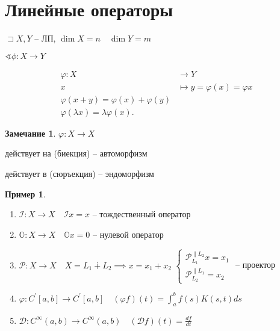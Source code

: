 \documentclass{book}
\newcommand{\p}[1]{#1^{\prime}}
\theoremstyle{definition}
\newtheorem*{note}{Замечание}
\newtheorem*{example}{Пример}
\begin{document}
\section{Линейные операторы}

 \begin{definition}
    $\sqsupset X, Y$ -- ЛП, $\dim X = n\quad \dim Y = m$

     $\sphericalangle \phi: X\to Y$

     \begin{align*}
         \varphi: X &\longrightarrow Y \\
         x &\longmapsto y = \varphi(x) = \varphi x\\
         \varphi(x+y) = \varphi(x) + \varphi(y)\\
         \varphi\left(\lambda x  \right) = \lambda \varphi(x) 
     .\end{align*}    
\end{definition}

\begin{note}
    $\varphi: X\longrightarrow X$

    действует на (биекция) -- автоморфизм

    действует в (сюръекция) -- эндоморфизм
\end{note}

\begin{example}
    \begin{enumerate}
        \item $\mathscr{I}: X\to X\quad \mathscr{I}x = x$ -- тождественный оператор
        \item $\mathbb{O}:X\to X\quad \mathbb{O}x = 0$ -- нулевой оператор
        \item  $\mathscr{P}:X\to X\quad X = L_1 \dotplus L_2 \implies x = x_1+x_2$
            $\begin{cases}
                \mathscr{P}_{L_1}^{\parallel L_2}x = x_1\\
                \mathscr{P}_{L_2}^{\parallel L_1} = x_2
            \end{cases}$ -- проектор
        \item $\varphi: \p C[a,b] \to  \p C[a,b]\quad \left( \varphi f \right) (t) = \int_a^bf(s)K(s,t)ds$
        \item $\mathscr{D}: C^{\infty }(a,b) \to  C^{\infty}(a,b)\quad \left( \mathscr{D}f \right) (t) = \frac{df}{dt}$
    \end{enumerate}
\end{example}
\end{document}
